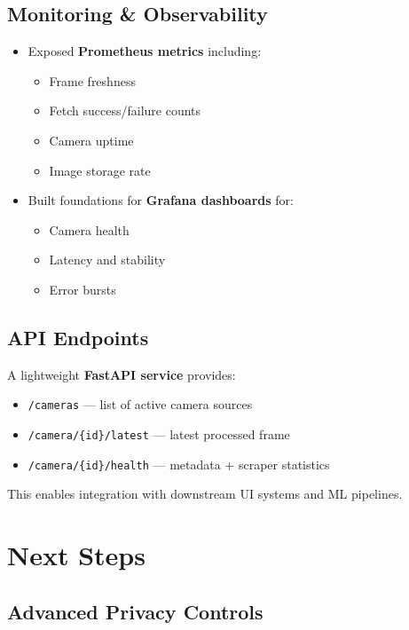 \subsection{Monitoring \& Observability}

\begin{itemize}
    \item Exposed \textbf{Prometheus metrics} including:
    \begin{itemize}
        \item Frame freshness
        \item Fetch success/failure counts
        \item Camera uptime
        \item Image storage rate
    \end{itemize}
    \item Built foundations for \textbf{Grafana dashboards} for:
    \begin{itemize}
        \item Camera health
        \item Latency and stability
        \item Error bursts
    \end{itemize}
\end{itemize}

\subsection{API Endpoints}

A lightweight \textbf{FastAPI service} provides:

\begin{itemize}
    \item \texttt{/cameras} — list of active camera sources
    \item \texttt{/camera/\{id\}/latest} — latest processed frame
    \item \texttt{/camera/\{id\}/health} — metadata + scraper statistics
\end{itemize}

This enables integration with downstream UI systems and ML pipelines.

\section{Next Steps}

\subsection{Advanced Privacy Controls}

